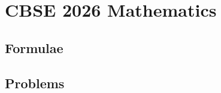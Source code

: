 \documentclass[journal]{IEEEtran}
\begin{document}
\newpage


\tableofcontents

\newpage
\onecolumn


\renewcommand{\thetable}{\theenumi}

\section{CBSE 2026 Mathematics}
\subsection{Formulae}

\subsection{Problems}

\end{document}
